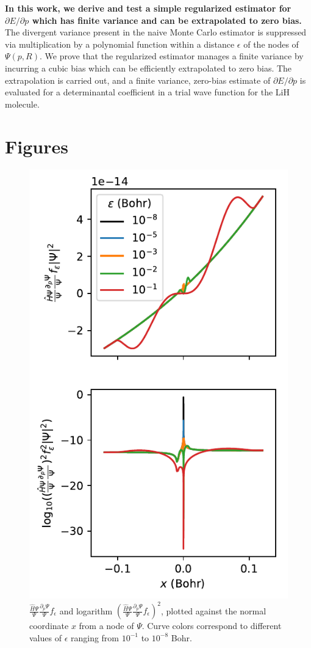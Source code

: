 \documentclass{article}
\begin{document}
\textbf{In this work, we derive and test a simple regularized estimator for $\partial E/\partial p$ which has finite variance and can be extrapolated to zero bias.}
The divergent variance present in the naive Monte Carlo estimator is suppressed via multiplication by a polynomial function within a distance $\epsilon$ of the nodes of $\Psi(p, R)$. 
We prove that the regularized estimator manages a finite variance by incurring a cubic bias which can be efficiently extrapolated to zero bias.
The extrapolation is carried out, and a finite variance, zero-bias estimate of $\partial E/\partial p$ is evaluated for a determinantal coefficient in a trial wave function for the LiH molecule.


\section{Figures}
\begin{figure}
\centering
\includegraphics{../2_plots/viznode.pdf}
\caption{$\frac{\hat{H}\Psi}{\Psi}\frac{\partial_p \Psi}{\Psi} f_\epsilon$ and logarithm $(\frac{\hat{H}\Psi}{\Psi}\frac{\partial_p \Psi}{\Psi} f_\epsilon)^2$, plotted against the normal coordinate $x$ from a node of $\Psi$. Curve colors correspond to different values of $\epsilon$ ranging from $10^{-1}$ to $10^{-8}$ Bohr.}
\end{figure}
\end{document}
